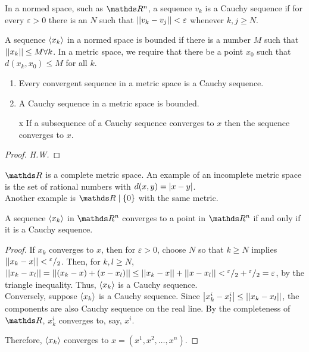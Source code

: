 \documentclass[../main-sheet.tex]{subfiles}
\begin{document}
In a normed space, such as $ \R^n $, a sequence $ v_k $ is a Cauchy sequence if for every $ \varepsilon>0 $ there is an $ N $ such that $ \left\vert\left\vert v_k-v_j\right\vert\right\vert<\varepsilon $ whenever $ k,j\geq N $.
\begin{defn}
    A sequence $ \left<x_k\right> $ in a normed space is bounded if there is a number $ M $ such that $ \left\vert\left\vert x_k\right\vert\right\vert\leq M \forall k $. In a metric space, we require that there be a point $ x_0 $ such that $ d(x_k,x_0)\leq M $ for all $ k $.
\end{defn}
\begin{thm}
    \begin{enumerate}[label=(\roman*)]
        \item Every convergent sequence in a metric space is a Cauchy sequence.
        \item A Cauchy sequence in a metric space is bounded.
        \item [x] If a subsequence of a Cauchy sequence converges to $ x $ then the sequence converges to $ x $.
    \end{enumerate}
\end{thm}
\begin{proof}
    \emph{H.W.}
\end{proof}
\begin{ex}
    $ \R $ is a complete metric space. An example of an incomplete metric space is the set of rational numbers with $ d(x,y)=\left\vert x-y\right\vert $.\\
    Another example is $ \R\mid\set{0} $ with the same metric.
\end{ex}
\begin{thm}
    A sequence $ \left<x_k\right> $ in $ \R^n $ converges to a point in $ \R^n $ if and only if it is a Cauchy sequence.
\end{thm}
\begin{proof}
    If $ x_k $ converges to $ x $, then for $ \varepsilon> 0$, choose $ N $ so that $ k\geq N $ implies $ \left\vert\left\vert x_k-x\right\vert\right\vert<{}^{\varepsilon}/{}_{2} $. Then, for $ k,l\geq N $, $ \left\vert\left\vert x_k-x_l\right\vert\right\vert=\left\vert\left\vert(x_k-x)+(x-x_l)\right\vert\right\vert\leq \left\vert\left\vert x_k-x\right\vert\right\vert+\left\vert\left\vert x-x_l\right\vert\right\vert<{}^{\varepsilon}/{}_{2}+{}^{\varepsilon}/{}_{2}=\varepsilon  $, by the triangle inequality. Thus, $ \left<x_k\right> $ is a Cauchy sequence.\\
    
    Conversely, suppose $ \left<x_k\right> $ is a Cauchy sequence. Since $ \left\vert x_k^i-x_l^i\right\vert \leq \left\vert\left\vert x_k-x_l\right\vert\right\vert$, the components are also Cauchy sequence on the real line. By the completeness of $ \R $, $ x_k^i $ converges to, say, $ x^i $.
    
    Therefore, $ \left<x_k\right> $ converges to $ x=\left( x^1,x^2,\dots,x^n \right) $.
\end{proof}
\end{document}
